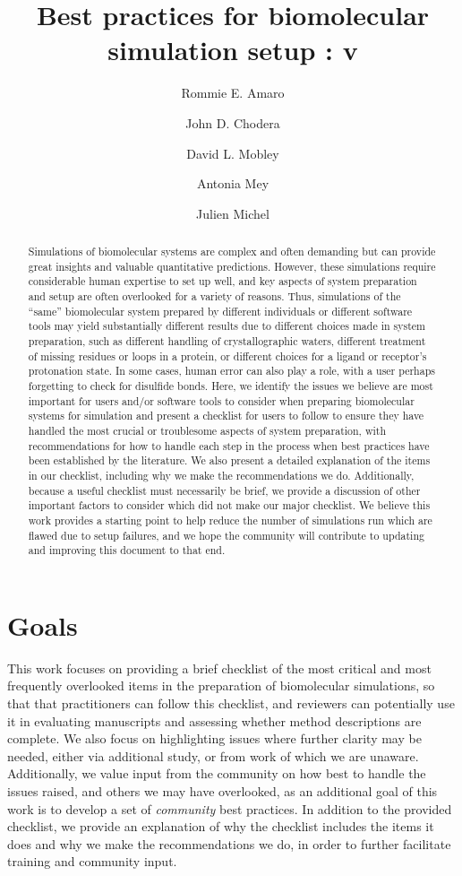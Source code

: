 \documentclass[9pt]{livecoms}
\title{Best practices for biomolecular simulation setup : v\versionnumber}
\author[1*]{Rommie E. Amaro}
\author[2*]{John D. Chodera}
\author[3*]{David L. Mobley}
\author[4*]{Antonia Mey}
\author[4*]{Julien Michel}
\affil[1]{Institution 1}
\affil[2]{Institution 2}
\affil[3]{Departments of Pharmaceutical Sciences and Chemistry, University of California, Irvine}
\affil[4]{Institution 4}
\begin{document}
\maketitle

\begin{abstract}
Simulations of biomolecular systems are complex and often demanding but can provide great insights and valuable quantitative predictions. 
However, these simulations require considerable human expertise to set up well, and key aspects of system preparation and setup are often overlooked for a variety of reasons.
Thus, simulations of the ``same'' biomolecular system prepared by different individuals or different software tools may yield substantially different results due to different choices made in system preparation, such as different handling of crystallographic waters, different treatment of missing residues or loops in a protein, or different choices for a ligand or receptor's protonation state. 
In some cases, human error can also play a role, with a user perhaps forgetting to check for disulfide bonds. 
Here, we identify the issues we believe are most important for users and/or software tools to consider when preparing biomolecular systems for simulation and present a checklist for users to follow to ensure they have handled the most crucial or troublesome aspects of system preparation, with recommendations for how to handle each step in the process when best practices have been established by the literature.
We also present a detailed explanation of the items in our checklist, including why we make the recommendations we do.
Additionally, because a useful checklist must necessarily be brief, we provide a discussion of other important factors to consider which did not make our major checklist. 
We believe this work provides a starting point to help reduce the number of simulations run which are flawed due to setup failures, and we hope the community will contribute to updating and improving this document to that end.

\end{abstract}

\section{Goals}

This work focuses on providing a brief checklist of the most critical and most frequently overlooked items in the preparation of biomolecular simulations, so that that practitioners can follow this checklist, and reviewers can potentially use it in evaluating manuscripts and assessing whether method descriptions are complete. 
We also focus on highlighting issues where further clarity may be needed, either via additional study, or from work of which we are unaware.
Additionally, we value input from the community on how best to handle the issues raised, and others we may have overlooked, as an additional goal of this work is to develop a set of \emph{community} best practices.
In addition to the provided checklist, we provide an explanation of why the checklist includes the items it does and why we make the recommendations we do, in order to further facilitate training and community input.
\end{document}
